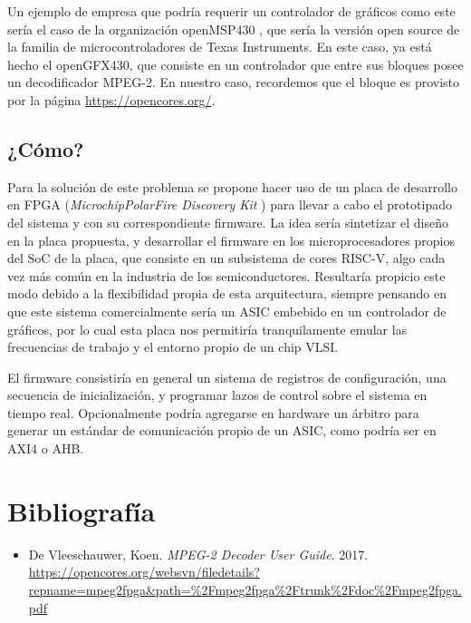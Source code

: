 \documentclass[a4,a4paper]{article}
\begin{document}
Un ejemplo de empresa que podría requerir un controlador de gráficos como este sería el caso de la organización openMSP430 , que sería la versión open source de la familia de microcontroladores de Texas Instruments. En este caso, ya está hecho el openGFX430, que consiste en un controlador que entre sus bloques posee un decodificador MPEG-2. En nuestro caso, recordemos que el bloque es provisto por la página \url{https://opencores.org/}.


\subsection{¿Cómo?}
\label{sec:como}

Para la solución de este problema se propone hacer uso de un placa de desarrollo en FPGA (\textit{Microchip\textregistered PolarFire Discovery Kit }) para llevar a cabo el prototipado del sistema y con su correspondiente firmware. La idea sería sintetizar el diseño en la placa propuesta, y desarrollar el firmware en los microprocesadores propios del SoC de la placa, que consiste en un subsistema de cores RISC-V, algo cada vez más común en la industria de los semiconductores. Resultaría propicio este modo debido a la flexibilidad propia de esta arquitectura, siempre pensando en que este sistema comercialmente sería un ASIC embebido en un controlador de gráficos, por lo cual esta placa nos permitiría tranquilamente emular las frecuencias de trabajo y el entorno propio de un chip VLSI.
\par El firmware consistiría en general un sistema de registros de configuración, una secuencia de inicialización, y programar lazos de control sobre el sistema en tiempo real. Opcionalmente podría agregarse en hardware  un árbitro para generar un estándar de comunicación propio de un ASIC, como podría ser en AXI4 o AHB.
\pagebreak
\newpage



\section{Bibliografía}
\label{sec:bibliografia}

\begin{itemize}
\item De Vleeschauwer, Koen. \textit{MPEG-2 Decoder User Guide}. 2017. \url{https://opencores.org/websvn/filedetails?repname=mpeg2fpga\&path=\%2Fmpeg2fpga\%2Ftrunk\%2Fdoc\%2Fmpeg2fpga.pdf}
\end{itemize}

\listoffigures
\end{document}
